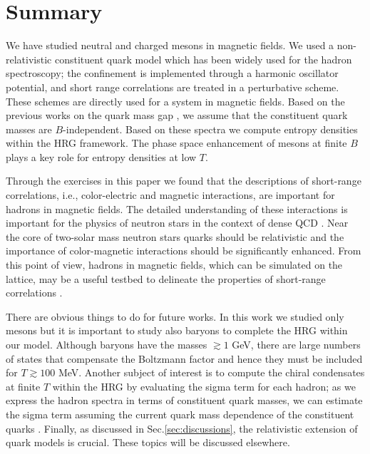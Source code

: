 \section{Summary}
\label{sec:summary}


We have studied neutral and charged mesons in magnetic fields. We used a non-relativistic constituent quark model which has been widely used for the hadron spectroscopy; the confinement is implemented through a harmonic oscillator potential, and short range correlations are treated in a perturbative scheme. These schemes are directly used for a system in magnetic fields. Based on the previous works on the quark mass gap \cite{Kojo:2012js,Kojo:2013uua,Kojo:2014gha,Hattori:2015aki}, we assume that the constituent quark masses are $B$-independent. 
Based on these spectra we compute entropy densities within the HRG framework. 
The phase space enhancement of mesons at finite $B$ plays a key role for entropy densities at low $T$.


Through the exercises in this paper we found that the descriptions of short-range correlations, i.e., color-electric and magnetic interactions, are important for hadrons in magnetic fields. The detailed understanding of these interactions is important for the physics of neutron stars in the context of dense QCD \cite{Baym:2017whm,Kojo:2020krb}. 
Near the core of two-solar mass neutron stars quarks should be relativistic and the importance of color-magnetic interactions should be significantly enhanced. 
From this point of view, hadrons in magnetic fields, which can be simulated on the lattice, may be a useful testbed to delineate the properties of short-range correlations \cite{Kojo:2021ugu,Kojo:2021hqh}.

There are obvious things to do for future works. In this work we studied only mesons but it is important to study also baryons to complete the HRG within our model. 
Although baryons have the masses $\gtrsim 1$ GeV, there are large numbers of states that compensate the Boltzmann factor and hence they must be included for $T\gtrsim 100$ MeV. Another subject of interest is to compute the chiral condensates at finite $T$ within the HRG by evaluating the sigma term for each hadron; as we express the hadron spectra in terms of constituent quark masses, we can estimate the sigma term assuming the current quark mass dependence of the constituent quarks \cite{Kunihiro:1990ts}. 
Finally, as discussed in Sec.\ref{sec:discussions}, the relativistic extension of quark models is crucial.
These topics will be discussed elsewhere.


